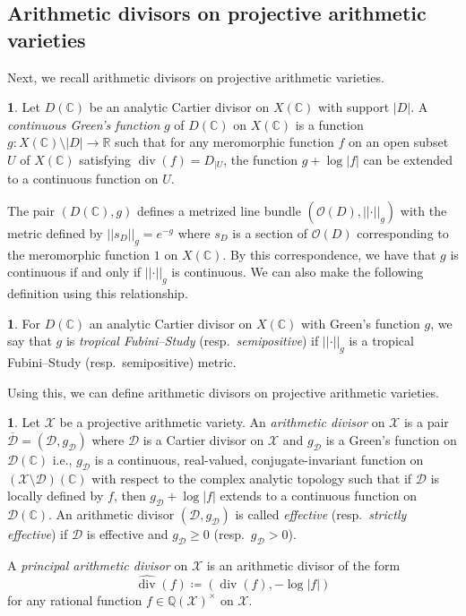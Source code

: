 \documentclass[11pt,reqno]{amsart}
\newcommand{\mR}{\mathbb{R}}
\newcommand{\mQ}{\mathbb{Q}}
\newcommand{\mC}{\mathbb{C}}
\newcommand{\cX}{\mathcal{X}}
\newcommand{\cD}{\mathcal{D}}
\newcommand{\cO}{\mathcal{O}}
\newcommand{\nrm}[1]{\left|\left |#1\right |\right |}
\theoremstyle{theorem}
\numberwithin{equation}{subsection}
\numberwithin{equation}{subsection}
\theoremstyle{definition}
\newtheorem{definition}[subsubsection]{\text{Definition}}
\theoremstyle{remark}
\numberwithin{equation}{subsubsection} \numberwithin{figure}{section}
\DeclareMathOperator{\ddiv}{div}
\newcommand{\cdef}[1]{\textsf{\textit{#1}}}
\renewcommand{\geq}{\geqslant}
\begin{document}
\subsection{Arithmetic divisors on projective arithmetic varieties}
\label{subsec:arithmeticdivisors}
Next, we recall arithmetic divisors on projective arithmetic varieties. 

\begin{definition}
Let $D(\mC)$ be an analytic Cartier divisor on $X(\mC)$ with support $|D|$. 
A \cdef{continuous Green's function} $g$ of $D(\mC)$ on $X(\mC)$ is a function $g\colon X(\mC)\setminus |D| \to \mR$ such that for any meromorphic function $f$ on an open subset $U$ of $X(\mC)$ satisfying $\ddiv(f) = D_{|U}$, the function $g + \log |f|$ can be extended to a continuous function on $U$. 
\end{definition}

The pair $(D(\mC),g)$ defines a metrized line bundle $(\cO(D),\nrm{\cdot}_g)$ with the metric defined by $\nrm{s_D}_g = e^{-g}$ where $s_D$ is a section of $\cO(D)$ corresponding to the meromorphic function $1$ on $X(\mC).$
By this correspondence, we have that $g$ is continuous if and only if $\nrm{\cdot}_g$ is continuous. 
We can also make the following definition using this relationship. 

\begin{definition}
For $D(\mC)$ an analytic Cartier divisor on $X(\mC)$ with Green's function $g$, we say that $g$ is \cdef{tropical Fubini--Study} (resp.~\cdef{semipositive}) if $\nrm{\cdot}_g$ is a tropical Fubini--Study (resp.~semipositive) metric. 
\end{definition}

Using this, we can define arithmetic divisors on projective arithmetic varieties. 

\begin{definition}\label{defn:arithmeticdivisor}
Let $\cX$ be a projective arithmetic variety. 
An \cdef{arithmetic divisor} on $\cX$ is a pair $\overline{\cD} = (\cD,g_{\cD})$ where $\cD$ is a Cartier divisor on $\cX$ and $g_{\cD}$ is a Green's function on $\cD(\mC)$ i.e., $g_{\cD}$ is a continuous, real-valued, conjugate-invariant function on $(\cX\setminus \cD)(\mC)$ with respect to the complex analytic topology such that if $\cD$ is locally defined by $f$, then $g_{\cD} + \log |f|$ extends to a continuous function on $\cD(\mC)$. 
An arithmetic divisor $(\cD,g_{\cD})$ is called \cdef{effective} (resp.~\cdef{strictly effective}) if $\cD$ is effective and $g_{\cD}\geq 0$ (resp.~$g_{\cD}>0$).

A \cdef{principal arithmetic divisor} on $\cX$ is an arithmetic divisor of the form
\[
\widehat{\ddiv}(f) \coloneqq (\ddiv(f),-\log |f|)
\]
for any rational function $f\in \mQ(\cX)^{\times}$ on $\cX$. 
\end{definition}
\end{document}

